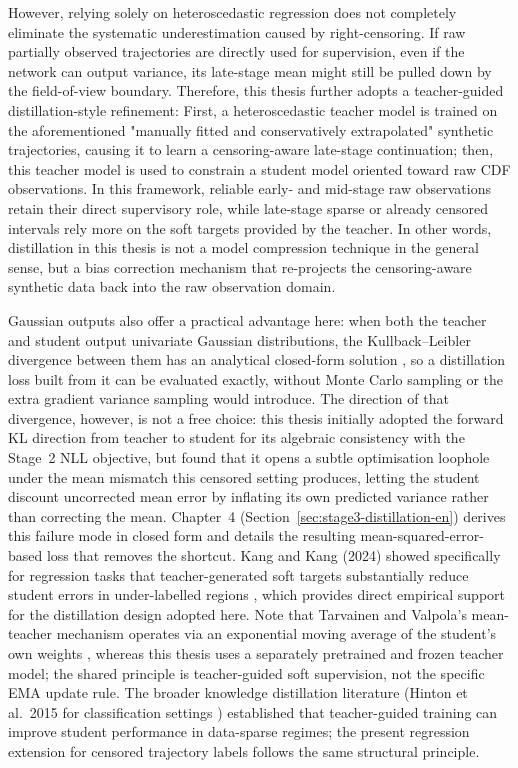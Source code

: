 However, relying solely on heteroscedastic regression does not completely eliminate the systematic underestimation caused by right-censoring.
If raw partially observed trajectories are directly used for supervision, even if the network can output variance, its late-stage mean might still be pulled down by the field-of-view boundary.
Therefore, this thesis further adopts a teacher-guided distillation-style refinement:
First, a heteroscedastic teacher model is trained on the aforementioned "manually fitted and conservatively extrapolated" synthetic trajectories, causing it to learn a censoring-aware late-stage continuation;
then, this teacher model is used to constrain a student model oriented toward raw CDF observations.
In this framework, reliable early- and mid-stage raw observations retain their direct supervisory role, while late-stage sparse or already censored intervals rely more on the soft targets provided by the teacher.
In other words, distillation in this thesis is not a model compression technique in the general sense, but a bias correction mechanism that re-projects the censoring-aware synthetic data back into the raw observation domain.

Gaussian outputs also offer a practical advantage here: when both the teacher and student output univariate Gaussian distributions, the Kullback--Leibler divergence between them has an analytical closed-form solution \cite{BishopPRML2006,KendallGal2017}, so a distillation loss built from it can be evaluated exactly, without Monte Carlo sampling or the extra gradient variance sampling would introduce. The direction of that divergence, however, is not a free choice: this thesis initially adopted the forward KL direction from teacher to student for its algebraic consistency with the Stage~2 NLL objective, but found that it opens a subtle optimisation loophole under the mean mismatch this censored setting produces, letting the student discount uncorrected mean error by inflating its own predicted variance rather than correcting the mean. Chapter~4 (Section~\ref{sec:stage3-distillation-en}) derives this failure mode in closed form and details the resulting mean-squared-error-based loss that removes the shortcut.
Kang and Kang (2024) showed specifically for regression tasks that teacher-generated soft targets substantially reduce student errors in under-labelled regions \cite{KangKang2024KDRegression}, which provides direct empirical support for the distillation design adopted here.
Note that Tarvainen and Valpola's mean-teacher mechanism operates via an exponential moving average of the student's own weights \cite{TarvainenValpola2017}, whereas this thesis uses a separately pretrained and frozen teacher model; the shared principle is teacher-guided soft supervision, not the specific EMA update rule.
The broader knowledge distillation literature (Hinton et al.\ 2015 for classification settings \cite{HintonVinyalsDean2015}) established that teacher-guided training can improve student performance in data-sparse regimes; the present regression extension for censored trajectory labels follows the same structural principle.

